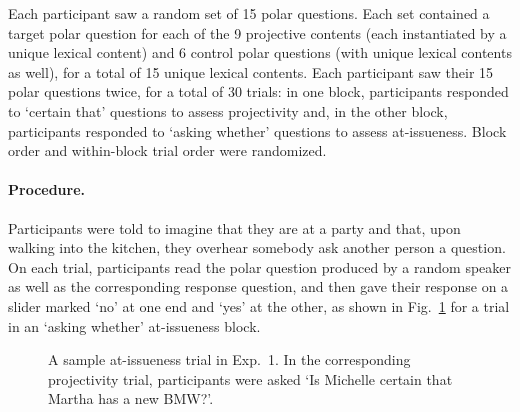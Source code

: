 \documentclass[11pt,fleqn]{article}
\newcommand{\6}{\mbox{$[\hspace*{-.6mm}[$}}
\newcommand{\9}{\mbox{$]\hspace*{-.6mm}]$}}
\newcommand{\figref}[1]{Fig.~\ref{#1}}
\begin{document}
Each participant saw a random set of 15 polar questions. Each set contained a target polar question for each of the 9 projective contents (each instantiated by a unique lexical content) and 6 control polar questions (with unique lexical contents as well), for a total of 15 unique lexical contents. Each participant saw their 15 polar questions twice, for a total of 30 trials: in one block, participants responded to `certain that' questions to assess projectivity and, in the other block, participants responded to `asking whether' questions to assess at-issueness. Block order and within-block trial order were randomized.



\paragraph{Procedure.} Participants were told to imagine that they are at a party and that, upon walking into the kitchen, they overhear somebody ask another person a question. On each trial, participants read the polar question produced by a random speaker as well as the corresponding response question, and then gave their response on a slider marked `no' at one end and `yes' at the other, as shown in \figref{f-trial-exp1} for a trial in an `asking whether' at-issueness block.  


\begin{figure}[h!]
\begin{center}
\end{center}
\caption{A sample at-issueness trial in Exp.~1. In the corresponding projectivity trial, participants were asked `Is Michelle certain that Martha has a new BMW?'.}\label{f-trial-exp1}
\end{figure}
\end{document}
